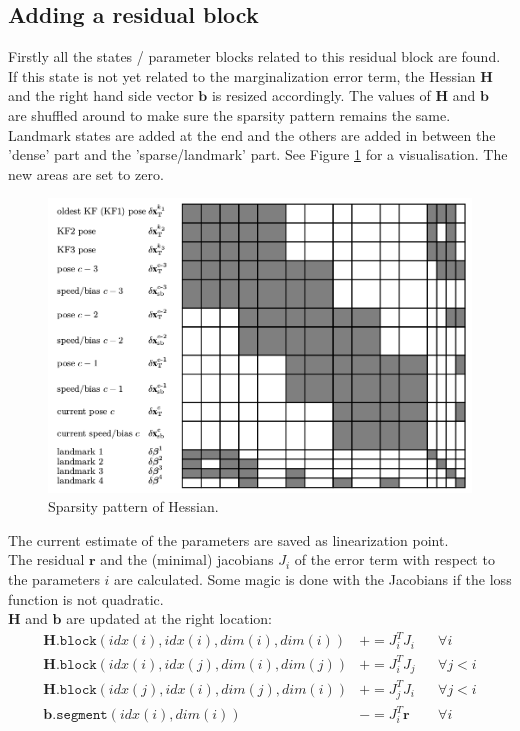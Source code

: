 \documentclass[10pt,a4paper]{article}
\numberwithin{equation}{section}
\renewcommand{\vec}[1]{\ensuremath{\mathbf{#1}}}
\newcommand{\mat}[1]{\ensuremath{\mathbf{#1}}}
\newcommand{\pluseq}{\mathrel{+}=}
\newcommand{\minuseq}{\mathrel{-}=}
\begin{document}
\subsection{Adding a residual block}
Firstly all the states / parameter blocks related to this residual block are found. If this state is not yet related to the marginalization error term, the Hessian $\mat{H}$ and the right hand side vector $\vec{b}$ is resized accordingly. The values of $\mat{H}$ and $\vec{b}$  are shuffled around to make sure the sparsity pattern remains the same. Landmark states are added at the end and the others are added in between the 'dense' part and the 'sparse/landmark' part. See Figure \ref{fig:sparsity_pattern} for a visualisation. The new areas are set to zero.
\begin{figure}[h]
\centering
\includegraphics[width=\textwidth]{sparsity_pattern.png}
\caption{Sparsity pattern of Hessian. \cite{LeuteneggerPHD}}
\label{fig:sparsity_pattern}
\end{figure}
The current estimate of the parameters are saved as linearization point.\\
The residual $\vec{r}$ and the (minimal) jacobians $J_{i}$ of the error term with respect to the parameters $i$ are calculated. Some magic is done with the Jacobians if the loss function is not quadratic.\\
$\mat{H}$ and $\vec{b}$ are updated at the right location:
\begin{align}
\mat{H}.\texttt{block}(idx(i), idx(i), dim(i), dim(i)) &\pluseq J_i^TJ_i && \forall i\\
\mat{H}.\texttt{block}(idx(i), idx(j), dim(i), dim(j)) &\pluseq J_i^TJ_j && \forall j < i\\
\mat{H}.\texttt{block}(idx(j), idx(i), dim(j), dim(i)) &\pluseq J_j^TJ_i && \forall j < i\\
\vec{b}.\texttt{segment}(idx(i), dim(i)) &\minuseq J_i^T \vec{r} && \forall i
\end{align}
\end{document}

